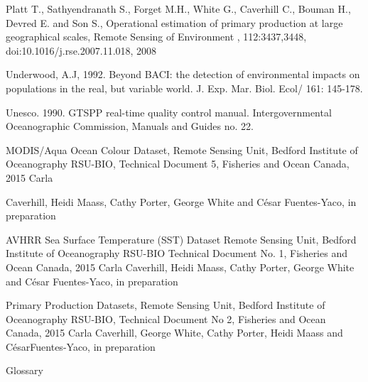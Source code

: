 \documentclass[letterpaper,portrait,12pt]{scrartcl}
\numberwithin{equation}{section}		%
\numberwithin{figure}{section}			%
\numberwithin{table}{section}				%
\begin{document}
Platt T., Sathyendranath S., Forget M.H., White G., Caverhill C., Bouman H., Devred E. and Son S., Operational estimation of primary production at large geographical scales, Remote Sensing of Environment , 112:3437,3448, doi:10.1016/j.rse.2007.11.018, 2008 









Underwood, A.J, 1992. Beyond BACI: the detection of environmental impacts on populations in the real, but variable world. J. Exp. Mar. Biol. Ecol/ 161: 145-178.









Unesco. 1990. GTSPP real-time quality control manual. Intergovernmental Oceanographic Commission, Manuals and Guides no. 22.














MODIS/Aqua Ocean Colour Dataset, Remote Sensing Unit, Bedford Institute of Oceanography RSU-BIO, Technical Document 5, Fisheries and Ocean Canada, 2015 Carla




Caverhill, Heidi Maass, Cathy Porter, George White and C\'{e}sar Fuentes-Yaco, in preparation














AVHRR Sea Surface Temperature (SST) Dataset Remote Sensing Unit, Bedford Institute of Oceanography RSU-BIO Technical Document No. 1, Fisheries and Ocean Canada, 2015 Carla Caverhill, Heidi Maass, Cathy Porter, George White and C\'{e}sar Fuentes-Yaco, in preparation




 









Primary Production Datasets, Remote Sensing Unit, Bedford Institute of Oceanography RSU-BIO, Technical Document No 2, Fisheries and Ocean Canada, 2015 Carla Caverhill, George White, Cathy Porter, Heidi Maass and C\'{e}sarFuentes-Yaco, in preparation



















Glossary
\end{document}

